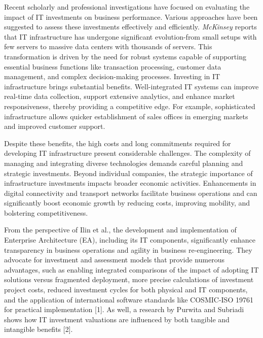 \documentclass[
]{article}
\begin{document}
Recent scholarly and professional investigations have focused on
evaluating the impact of IT investments on business performance. Various
approaches have been suggested to assess these investments effectively
and efficiently. \emph{McKinsey} reports that IT infrastructure has
undergone significant evolution-from small setups with few servers to
massive data centers with thousands of servers. This transformation is
driven by the need for robust systems capable of supporting essential
business functions like transaction processing, customer data
management, and complex decision-making processes. Investing in IT
infrastructure brings substantial benefits. Well-integrated IT systems
can improve real-time data collection, support extensive analytics, and
enhance market responsiveness, thereby providing a competitive edge. For
example, sophisticated infrastructure allows quicker establishment of
sales offices in emerging markets and improved customer support.

Despite these benefits, the high costs and long commitments required for
developing IT infrastructure present considerable challenges. The
complexity of managing and integrating diverse technologies demands
careful planning and strategic investments. Beyond individual companies,
the strategic importance of infrastructure investments impacts broader
economic activities. Enhancements in digital connectivity and transport
networks facilitate business operations and can significantly boost
economic growth by reducing costs, improving mobility, and bolstering
competitiveness.

From the perspective of Ilin et al., the development and implementation
of Enterprise Architecture (EA), including its IT components,
significantly enhance transparency in business operations and agility in
business re-engineering. They advocate for investment and assessment
models that provide numerous advantages, such as enabling integrated
comparisons of the impact of adopting IT solutions versus fragmented
deployment, more precise calculations of investment project costs,
reduced investment cycles for both physical and IT components, and the
application of international software standards like COSMIC-ISO 19761
for practical implementation {[}1{]}. As well, a research by Purwita and
Subriadi shows how IT investment valuations are influenced by both
tangible and intangible benefits {[}2{]}.
\end{document}
